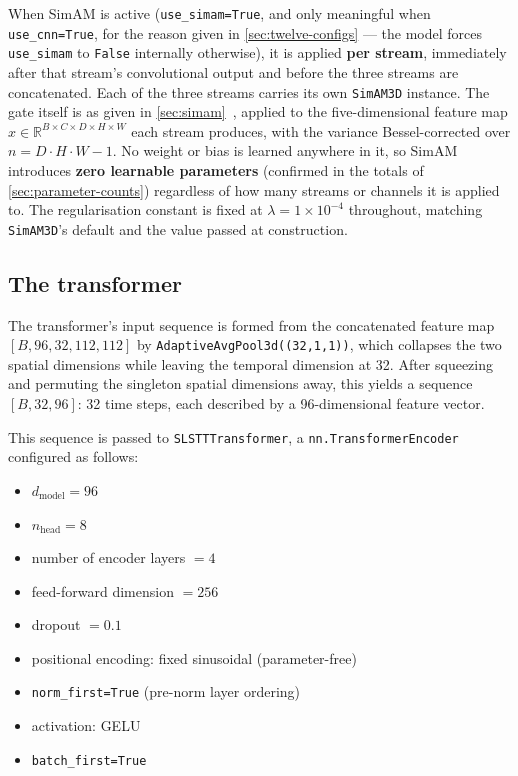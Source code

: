 When SimAM is active (\texttt{use\_simam=True}, and only meaningful when \texttt{use\_cnn=True}, for the reason given in \autoref{sec:twelve-configs} --- the model forces \texttt{use\_simam} to \texttt{False} internally otherwise), it is applied \textbf{per stream}, immediately after that stream's convolutional output and before the three streams are concatenated. Each of the three streams carries its own \texttt{SimAM3D} instance. The gate itself is as given in \autoref{sec:simam}~\cite{yang2021}, applied to the five-dimensional feature map $x \in \mathbb{R}^{B \times C \times D \times H \times W}$ each stream produces, with the variance Bessel-corrected over $n = D \cdot H \cdot W - 1$. No weight or bias is learned anywhere in it, so SimAM introduces \textbf{zero learnable parameters} (confirmed in the totals of \autoref{sec:parameter-counts}) regardless of how many streams or channels it is applied to. The regularisation constant is fixed at $\lambda = 1 \times 10^{-4}$ throughout, matching \texttt{SimAM3D}'s default and the value passed at construction.

\subsection{The transformer}
\label{sec:transformer-config}

The transformer's input sequence is formed from the concatenated feature map $[B,96,32,112,112]$ by \texttt{AdaptiveAvgPool3d((32,1,1))}, which collapses the two spatial dimensions while leaving the temporal dimension at 32. After squeezing and permuting the singleton spatial dimensions away, this yields a sequence $[B,32,96]$: 32 time steps, each described by a 96-dimensional feature vector.

This sequence is passed to \texttt{SLSTTTransformer}, a \texttt{nn.TransformerEncoder} configured as follows:

\begin{itemize}
	\item $d_{\text{model}} = 96$
	\item $n_{\text{head}} = 8$
	\item number of encoder layers $= 4$
	\item feed-forward dimension $= 256$
	\item dropout $= 0.1$
	\item positional encoding: fixed sinusoidal (parameter-free)
	\item \texttt{norm\_first=True} (pre-norm layer ordering)
	\item activation: GELU
	\item \texttt{batch\_first=True}
\end{itemize}

